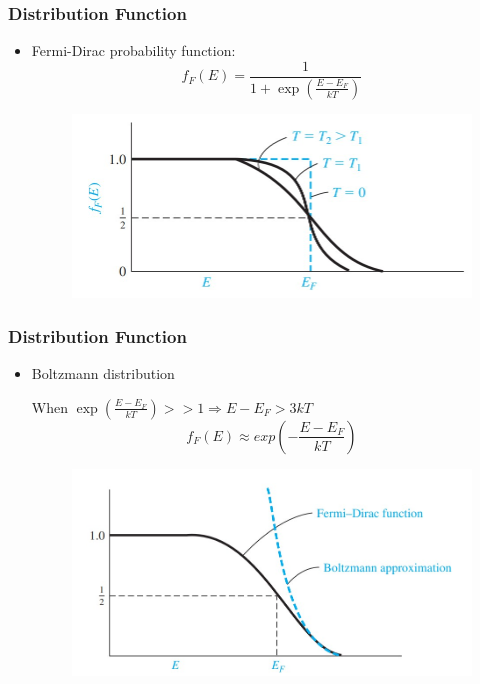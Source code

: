 \documentclass{beamer}
\begin{document}
    \begin{frame} \frametitle{Distribution Function}
        \begin{itemize}
            \item Fermi-Dirac probability function:
                \begin{equation*}
                    f_F(E) = \frac{1}{1 + \exp\left( \frac{E - E_F}{kT}  \right)} 
                \end{equation*}
                \begin{figure}[H]
                    \centering
                    \includegraphics[width=0.8\linewidth]{Fermi-distribution.jpg}
                    \label{fig:Fermi-distribution.jpg}
                \end{figure}
        \end{itemize}
    \end{frame}

    \begin{frame} \frametitle{Distribution Function}
        \begin{itemize}
            \item Boltzmann distribution
                \par When $\exp \left( \frac{E - E_F}{kT} \right) >> 1 \Rightarrow E - E_F > 3kT$
                \begin{equation*}
                    f_F(E) \approx exp\left( -\frac{E - E_F}{kT}  \right)
                \end{equation*}
                \begin{figure}[H]
                    \centering
                    \includegraphics[width=0.8\linewidth]{Boltzmann-distribution.jpg}
                    \label{fig:Boltzmann-distribution.jpg}
                \end{figure}
        \end{itemize}
    \end{frame}
\end{document}
